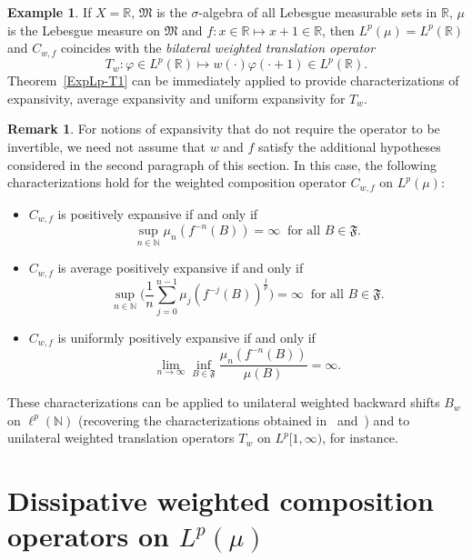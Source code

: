 \documentclass[12pt]{article}
\theoremstyle{plain}
\theoremstyle{definition}
\newtheorem{remark}[theorem]{Remark}%
\newtheorem{example}[theorem]{Example}%
\newcommand{\N}{\mathbb{N}} %
\newcommand{\R}{\mathbb{R}} %
\newcommand{\fF}{\mathfrak{F}}
\newcommand{\fM}{\mathfrak{M}}
\begin{document}
\begin{example}
If $X = \R$, $\fM$ is the $\sigma$-algebra of all Lebesgue measurable sets in $\R$, $\mu$ is the Lebesgue measure on $\fM$ 
and $f : x \in \R \mapsto x+1 \in \R$, then $L^p(\mu) = L^p(\R)$ and $C_{w,f}$ coincides with the 
{\em bilateral weighted translation operator}
\[
T_w : \varphi \in L^p(\R) \mapsto w(\cdot) \varphi(\cdot + 1) \in L^p(\R).
\]
Theorem~\ref{ExpLp-T1} can be immediately applied to provide characterizations of expansivity, average expansivity 
and uniform expansivity for $T_w$.
\end{example}

\begin{remark}
For notions of expansivity that do not require the operator to be invertible, 
we need not assume that $w$ and $f$ satisfy the additional hypotheses considered in the second paragraph of this section. 
In this case, the following characterizations hold for the weighted composition operator $C_{w,f}$ on $L^p(\mu)$:
\begin{itemize}
\item [\rm (a)] $C_{w,f}$ is positively expansive if and only if 
    \[ 
    \sup_{n \in \N} \mu_n(f^{-n}(B)) = \infty \ \text{ for all } B \in \fF.
    \]
\item [\rm (b)] $C_{w,f}$ is average positively expansive if and only if
   \[ 
    \sup_{n \in \N} \Big(\frac{1}{n} \sum_{j=0}^{n-1} \mu_j(f^{-j}(B))^\frac{1}{p}\Big) = \infty \ \text{ for all } B \in \fF.
    \]
\item [\rm (c)] $C_{w,f}$ is uniformly positively expansive if and only if 
    \[ 
    \lim_{n \to \infty} \inf_{B \in \fF} \frac{\mu_n(f^{-n}(B))}{\mu(B)} = \infty.
    \]
\end{itemize}
These characterizations can be applied to unilateral weighted backward shifts $B_w$ on $\ell^p(\N)$
(recovering the characterizations obtained in~\cite{AlvBerMes21} and~\cite{BerCirDarMesPuj18}) and
to unilateral weighted translation operators $T_w$ on $L^p[1,\infty)$, for instance.
\end{remark}


\section{Dissipative weighted composition operators on $L^p(\mu)$}\label{S-Dissipative}
\end{document}
